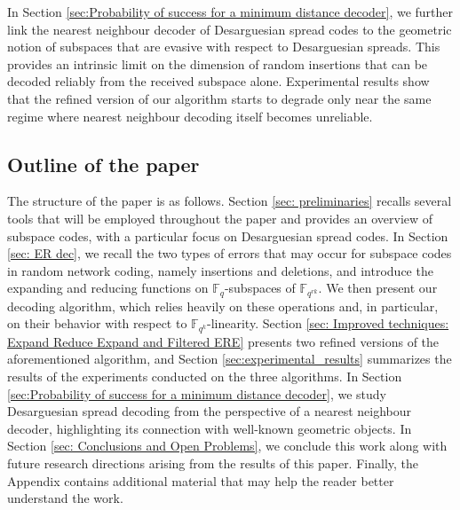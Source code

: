 \documentclass{article}
\newcommand{\Fq}{\mathbb{F}_{q}}
\begin{document}
In Section \ref{sec:Probability of success for a minimum distance decoder}, we further link the nearest neighbour decoder of Desarguesian spread codes to the geometric notion of subspaces that are evasive with respect to Desarguesian spreads. This provides an intrinsic limit on the dimension of random insertions that can be decoded reliably from the received subspace alone.
Experimental results show that the refined version of our algorithm starts to degrade only near the same regime where nearest neighbour decoding itself becomes unreliable.

 

 \subsection{Outline of the paper} 
 The structure of the paper is as follows. Section \ref{sec: preliminaries} recalls several tools that will be employed throughout the paper and provides an overview of subspace codes, with a particular focus on Desarguesian spread codes. In Section \ref{sec: ER dec}, we recall the two types of errors that may occur for subspace codes in random network coding, namely insertions and deletions, and introduce the expanding and reducing functions on $\Fq$-subspaces of $\mathbb{F}_{q^{rk}}$. We then present our decoding algorithm, which relies heavily on these operations and, in particular, on their behavior with respect to $\mathbb{F}_{q^k}$-linearity. Section \ref{sec: Improved techniques: Expand Reduce Expand and Filtered ERE} presents two refined versions of the  aforementioned algorithm, and Section \ref{sec:experimental_results} summarizes the results of the experiments conducted on the three algorithms. In Section \ref{sec:Probability of success for a minimum distance decoder}, we study Desarguesian spread decoding from the perspective of a nearest neighbour decoder, highlighting its connection with well-known geometric objects. In Section \ref{sec: Conclusions and Open Problems}, we conclude this work along with future research directions arising from the results of this paper. Finally, the Appendix contains additional material that may help the reader better understand the work.
\end{document}
